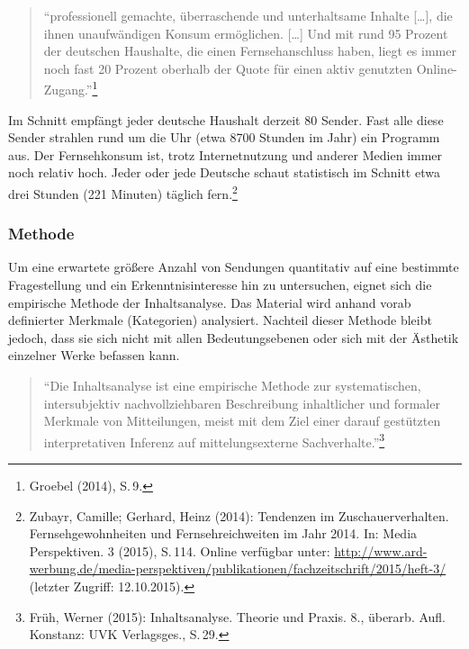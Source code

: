 \begin{flushleft}
\begin{quote}
\enquote{professionell gemachte, überraschende und unterhaltsame Inhalte
{[}\ldots{}{]}, die ihnen unaufwändigen Konsum ermöglichen.
{[}\ldots{}{]} Und mit rund 95 Prozent der deutschen Haushalte, die
einen Fernsehanschluss haben, liegt es immer noch fast 20 Prozent
oberhalb der Quote für einen aktiv genutzten Online-Zugang.}\footnote{Groebel
  (2014), S.\,9.}
\end{quote}
\end{flushleft}

Im Schnitt empfängt jeder deutsche Haushalt derzeit 80 Sender. Fast alle
diese Sender strahlen rund um die Uhr (etwa 8700 Stunden im Jahr) ein
Programm aus. Der Fernsehkonsum ist, trotz Internetnutzung und anderer
Medien immer noch relativ hoch. Jeder oder jede Deutsche schaut
statistisch im Schnitt etwa drei Stunden (221 Minuten) täglich
fern.\footnote{Zubayr, Camille; Gerhard, Heinz (2014): Tendenzen im
  Zuschauerverhalten. Fernsehgewohnheiten und Fernsehreichweiten im Jahr
  2014. In: Media Perspektiven. 3 (2015), S.\,114. Online verfügbar
  unter:
  \url{http://www.ard-werbung.de/media-perspektiven/publikationen/fachzeitschrift/2015/heft-3/}
  (letzter Zugriff: 12.10.2015).}

\subsubsection{Methode}\label{methode}

Um eine erwartete größere Anzahl von Sendungen quantitativ auf eine
bestimmte Fragestellung und ein Erkenntnisinteresse hin zu untersuchen,
eignet sich die empirische Methode der Inhaltsanalyse. Das Material wird
anhand vorab definierter Merkmale (Kategorien) analysiert. Nachteil
dieser Methode bleibt jedoch, dass sie sich nicht mit allen
Bedeutungsebenen oder sich mit der Ästhetik einzelner Werke befassen
kann.

\begin{flushleft}
\begin{quote}
\enquote{Die Inhaltsanalyse ist eine empirische Methode zur
systematischen, intersubjektiv nachvollziehbaren Beschreibung
inhaltlicher und formaler Merkmale von Mitteilungen, meist mit dem Ziel
einer darauf gestützten interpretativen Inferenz auf mittelungsexterne
Sachverhalte.}\footnote{Früh, Werner (2015): Inhaltsanalyse. Theorie und
  Praxis. 8., überarb. Aufl. Konstanz: UVK Verlagsges., S.\,29.}
\end{quote}
\end{flushleft}

